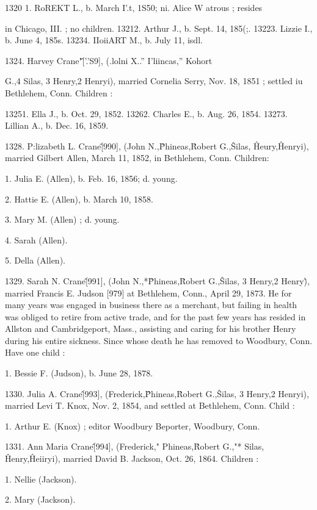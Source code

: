 1320  1. RoREKT L., b. March I'.t, 1S50; ni. Alice W atrous ; resides 

in Chicago, III. ; no children. 
13212. Arthur J., b. Sept. 14, 185(;. 
13223. Lizzie I., b. June 4, 185s. 
13234. IIoiiART M., b. July 11, isdl. 

1324. Harvey Crane"\^ ['.'S9], (.lolni X..'' I'liincas,'' Kohort 




G.,4 Silas, 3 Henry,2 Henryi), married Cornelia Serry, Nov. 18, 
1851 ; settled iu Bethlehem, Conn. Children : 

13251. Ella J., b. Oct. 29, 1852. 
13262. Charles E., b. Aug. 26, 1854. 
13273. Lillian A., b. Dec. 16, 1859. 

1328. P:lizabeth L. Crane\^ [990], (John N.,\^ Phineas,\^ 
Robert G.,\^ Silas, \^ Heury,\^ Henryi), married Gilbert Allen, 
March 11, 1852, in Bethlehem, Conn. Children: 

1. Julia E. (Allen), b. Feb. 16, 1856; d. young. 

2. Hattie E. (Allen), b. March 10, 1858. 

3. Mary M. (Allen) ; d. young. 

4. Sarah (Allen). 

5. Della (Allen). 

1329. Sarah N. Crane\^ [991], (John N.,*\^ Phineas,\^ Robert 
G.,\^ Silas, 3 Henry,2 Henry\^), married Francis E. Judson [979] 
at Bethlehem, Conn., April 29, 1873. He for many years was 
engaged in business there as a merchant, but failing in health was 
obliged to retire from active trade, and for the past few years 
has resided in Allston and Cambridgeport, Mass., assisting and 
caring for his brother Henry during his entire sickness. Since 
whose death he has removed to Woodbury, Conn. Have one 
child : 

1. Bessie F. (Judson), b. June 28, 1878. 

1330. Julia A. Crane\^ [993], (Frederick,\^ Phineas,\^ Robert 
G.,\^ Silas, 3 Henry,2 Henryi), married Levi T. Knox, Nov. 2, 
1854, and settled at Bethlehem, Conn. Child : 

1. Arthur E. (Knox) ; editor Woodbury Beporter, Woodbury, Conn. 

1331. Ann Maria Crane\^ [994], (Frederick," Phineas,\^ 
Robert G.,"* Silas, \^ Henry,\^ Heiiryi), married David B. Jackson, 
Oct. 26, 1864. Children : 

1. Nellie (Jackson). 

2. Mary (Jackson). 

